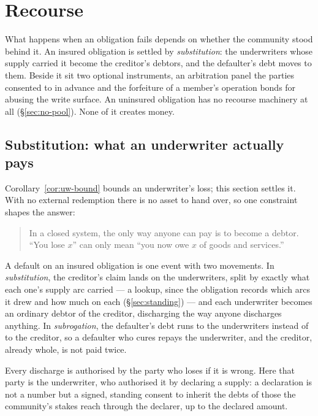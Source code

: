 \section{Recourse}
\label{sec:recourse}

What happens when an obligation fails depends on whether the community stood behind it.
An insured obligation is settled by \emph{substitution}: the underwriters whose supply
carried it become the creditor's debtors, and the defaulter's debt moves to them. Beside
it sit two optional instruments, an arbitration panel the parties consented to in advance
and the forfeiture of a member's operation bonds for abusing the write surface. An
uninsured obligation has no recourse machinery at all (\S\ref{sec:no-pool}). None of it
creates money.

\subsection{Substitution: what an underwriter actually pays}
\label{sec:substitution}

Corollary~\ref{cor:uw-bound} bounds an underwriter's loss; this section settles it. With
no external redemption there is no asset to hand over, so one constraint shapes the answer:

\begin{quote}
In a closed system, the only way anyone can pay is to become a debtor. ``You lose $x$''
can only mean ``you now owe $x$ of goods and services.''
\end{quote}

A default on an insured obligation is one event with two movements. In
\emph{substitution}, the creditor's claim lands on the underwriters, split by exactly what
each one's supply arc carried --- a lookup, since the obligation records which arcs it
drew and how much on each (\S\ref{sec:standing}) --- and each underwriter becomes an
ordinary debtor of the creditor, discharging the way anyone discharges anything. In
\emph{subrogation}, the defaulter's debt runs to the underwriters instead of to the
creditor, so a defaulter who cures repays the underwriter, and the creditor, already
whole, is not paid twice.

\begin{property}
\label{prop:uw-consent}
Every discharge is authorised by the party who loses if it is wrong. Here that party is
the underwriter, who authorised it by declaring a supply: a declaration is not a number
but a signed, standing consent to inherit the debts of those the community's stakes
reach through the declarer, up to the declared amount.
\end{property}

